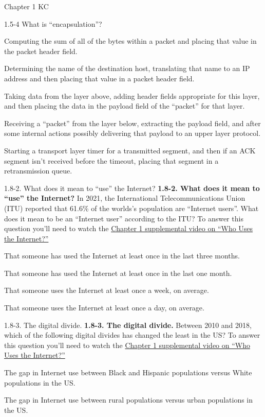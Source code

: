 \documentclass[a4paper]{article}
\begin{document}
\begin{quiz}{Chapter 1 KC}
\begin{multi}[points=1]{1.5-4 What is ``encapsulation''?}
\item Computing the sum of all of the bytes within a packet and placing that value in the packet header field.
\item Determining the name of the destination host, translating that name to an IP address and then placing that value in a packet header field.
\item* Taking data from the layer above, adding header fields appropriate for this layer, and then placing the data in the payload field of the ``packet'' for that layer.
\item Receiving a ``packet'' from the layer below, extracting the payload field, and after some internal actions possibly delivering that payload to an upper layer protocol.
\item Starting a transport layer timer for a transmitted segment, and then if an ACK segment isn't received before the timeout, placing that segment in a retransmission queue.
\end{multi}

\begin{multi}[points=1]{1.8-2. What does it mean to ``use'' the Internet?}
\textbf{1.8-2. What does it mean to ``use'' the Internet?} 
In 2021, the International Telecommunications Union (ITU) reported that 61.6\% of the worlds's population are ``Internet users''.  What does it mean to be an ``Internet user'' according to the ITU? 
To answer this question you'll need to watch the \href{https://www.youtube.com/watch?v=-YaGGf8C1A4}{Chapter 1 supplemental video on ``Who Uses the Internet?''}

\item* That someone has used the Internet at least once in the last three months.
\item That someone has used the Internet at least once in the last one month.
\item That someone uses the Internet at least once a week, on average.
\item That someone uses the Internet at least once a day, on average.
\end{multi}

\begin{multi}[points=1]{1.8-3. The digital divide.}
\textbf{1.8-3.  The digital divide.} 
Between 2010 and 2018, which of the following digital divides has changed the least in the US? 
To answer this question you'll need to watch the \href{https://www.youtube.com/watch?v=-YaGGf8C1A4}{Chapter 1 supplemental video on ``Who Uses the Internet?''}
\item* The gap in Internet use between Black and Hispanic populations versus White populations in the US.
\item The gap in Internet use between rural populations versus urban populations in the US.
\end{multi}


\end{quiz}
\end{document}
